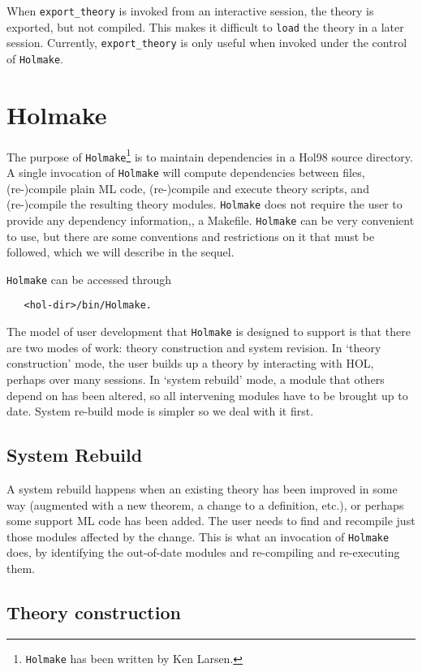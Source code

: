 \documentclass[12pt,fleqn,layout,a4paper]{report}
\begin{document}
When \verb+export_theory+ is invoked from an interactive session, the
theory is exported, but not compiled. This makes it difficult to
\verb+load+ the theory in a later session. Currently,
\verb+export_theory+ is only useful when invoked under the control of
\verb+Holmake+.

\section{Holmake}

  The purpose of \verb+Holmake+\footnote{{\tt Holmake} has been written by
Ken Larsen.} is to maintain dependencies in a Hol98 source directory. A
single invocation of {\tt Holmake} will compute dependencies between files,
(re-)compile plain ML code, (re-)compile and execute theory scripts, and
(re-)compile the resulting theory modules. {\tt Holmake} does not require the
user to provide any dependency information,\eg, a Makefile. {\tt Holmake}
can be very convenient to use, but there are some conventions and
restrictions on it that must be followed, which we will describe in the
sequel.

{\tt Holmake} can be accessed through
\begin{verbatim}
   <hol-dir>/bin/Holmake.
\end{verbatim}


  The model of user development that {\tt Holmake} is designed to support is
that there are two modes of work: theory construction and system
revision.  In `theory construction' mode, the user builds up a theory by
interacting with HOL, perhaps over many sessions. In `system rebuild'
mode, a module that others depend on has been altered, so all
intervening modules have to be brought up to date. System re-build mode
is simpler so we deal with it first.


\subsection{System Rebuild}

A system rebuild happens when an existing theory has been improved in
some way (augmented with a new theorem, a change to a definition, etc.),
or perhaps some support ML code has been added. The user needs to find
and recompile just those modules affected by the change. This is what an
invocation of {\tt Holmake} does, by identifying the out-of-date modules and
re-compiling and re-executing them.


\subsection{Theory construction}
\end{document}

